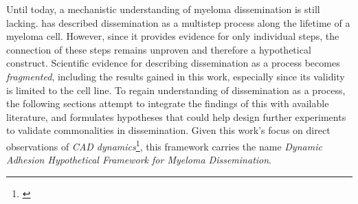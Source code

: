 %
\label{sec:discussion_framework}%
Until today, a mechanistic understanding of myeloma dissemination is still
lacking. \citet{zeissigTumourDisseminationMultiple2020} has described
dissemination as a multistep process along the lifetime of a myeloma cell.
However, since it provides evidence for only individual steps, the connection of these steps remains unproven and
therefore a hypothetical construct. Scientific evidence for describing
dissemination as a process becomes \emph{fragmented}, including the results
gained in this work, especially since its validity is limited to the \INA cell
line. To regain understanding of dissemination as a process, the following
sections attempt to integrate the findings of this with available literature,
and formulates hypotheses that could help design further experiments to validate
commonalities in dissemination. Given this work's focus on direct observations of
\emph{\ac{CAD}
      dynamics}\footnote{\footattachdetachdynamics\label{foot:attachdetach_dynamics}},
this framework carries the name \emph{Dynamic Adhesion Hypothetical Framework
      for Myeloma Dissemination}.







